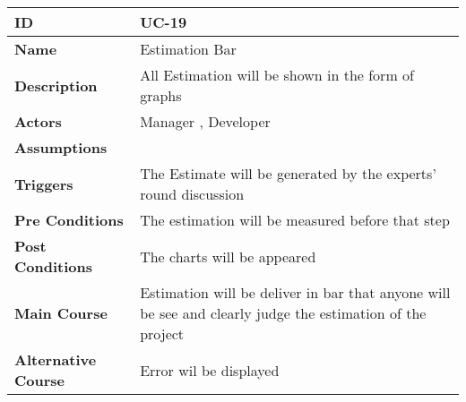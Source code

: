     \begin{center}
        \begin{tabularx}{\textwidth}{|l|X|}
            \hline
            \textbf{ID} & UC-19 \\
            \hline
            \textbf{Name} & Estimation Bar \\
            \hline
            \textbf{Description} & All Estimation will be shown in the form of graphs \\
            \hline
            \textbf{Actors} & Manager , Developer \\
            \hline
            \textbf{Assumptions} &  \\
            \hline
            \textbf{Triggers} & The Estimate will be generated by the experts' round discussion \\
            \hline
            \textbf{Pre Conditions} & The estimation will be measured before that step  \\
            \hline
            \textbf{Post Conditions} & The charts will be appeared \\
            \hline
            \textbf{Main Course} & Estimation will be deliver in bar that anyone will be see and clearly judge the estimation of the project \\
            \hline
            \textbf{Alternative Course} & Error wil be displayed \\
            \hline
            
        \end{tabularx}
    \end{center}
    \newpage
    
